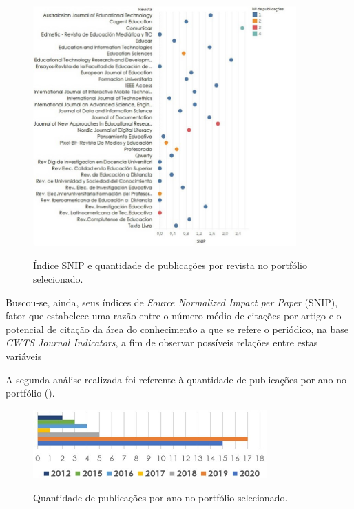 \documentclass[portuguese]{textolivre}
\begin{document}
\begin{figure}[htbp]
\centering
\caption{Índice SNIP e quantidade de publicações por revista no portfólio selecionado.}
\includegraphics[width=0.9\textwidth]{figura01.png}
\label{Figura01}
\end{figure}

Buscou-se, ainda, seus índices de \textit{Source Normalized Impact per Paper} (SNIP), fator que estabelece uma razão entre o número médio de citações por artigo e o potencial de citação da área do conhecimento a que se refere o periódico, na base \textit{CWTS Journal Indicators}, a fim de observar possíveis relações entre estas variáveis 

A segunda análise realizada foi referente à quantidade de publicações por ano no portfólio ().

\begin{figure}[htbp]
\centering
\caption{Quantidade de publicações por ano no portfólio selecionado.}
\includegraphics[width=0.8\textwidth]{figura02.png}
\label{Figura02}
\end{figure}
\end{document}
